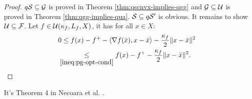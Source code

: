 \documentclass[12pt]{report}
\begin{document}
            \begin{proof}
                $q\mathcal{S} \subseteq \mathcal G$ is proved in Theorem \ref{thm:qscnvx-implies-qgg} and $\mathcal G \subseteq \mathcal U$ is proved in Theorem \ref{thm:qgg-implies-qua}. 
                $\mathcal S\subseteq q\mathcal{S}'$ is obvious. 
                It remains to show $\mathcal U \subseteq \mathcal F$. 
                Let $f\in \mathcal U(\kappa_f, L_f, X)$, it has for all $x \in X$: 
                \begin{align*}
                    0 &\le f(x) - f^+ - \langle \nabla f(\bar x), x - \bar x\rangle - \frac{\kappa_f}{2}\Vert x - \bar x\Vert^2
                    \\
                    &\hspace{-0.5em}\underset{\eqref{ineq:pg-opt-cond}}{\le} 
                    f(x) - f^+ - \frac{\kappa_f}{2}\Vert x - \bar x\Vert^2. 
                \end{align*}
            \end{proof}
            \begin{remark}
                It's Theorem 4 in Necoara et al. \cite{necoara_linear_2019}.
            \end{remark}
\end{document}
